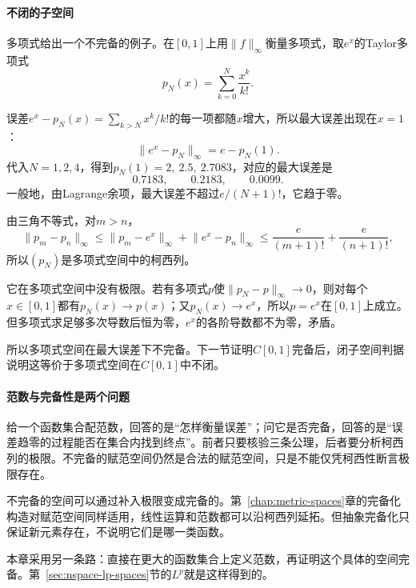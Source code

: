 \paragraph{不闭的子空间}
多项式给出一个不完备的例子。在$[0,1]$上用$\lVert f\rVert_\infty$衡量多项式，取$e^x$的Taylor多项式
\[
 p_N(x)=\sum_{k=0}^N\frac{x^k}{k!}.
\]

误差$e^x-p_N(x)=\sum_{k>N}x^k/k!$的每一项都随$x$增大，所以最大误差出现在$x=1$：
\[
 \lVert e^x-p_N\rVert_\infty=e-p_N(1).
\]
代入$N=1,2,4$，得到$p_N(1)=2,\ 2.5,\ 2.7083$，对应的最大误差是
\[
 0.7183,\qquad 0.2183,\qquad 0.0099.
\]
一般地，由Lagrange余项，最大误差不超过$e/(N+1)!$，它趋于零。

由三角不等式，对$m>n$，
\[
 \lVert p_m-p_n\rVert_\infty\leq\lVert p_m-e^x\rVert_\infty+\lVert e^x-p_n\rVert_\infty\leq\frac{e}{(m+1)!}+\frac{e}{(n+1)!},
\]
所以$(p_N)$是多项式空间中的柯西列。

它在多项式空间中没有极限。若有多项式$p$使$\lVert p_N-p\rVert_\infty\to0$，则对每个$x\in[0,1]$都有$p_N(x)\to p(x)$；又$p_N(x)\to e^x$，所以$p=e^x$在$[0,1]$上成立。但多项式求足够多次导数后恒为零，$e^x$的各阶导数都不为零，矛盾。

所以多项式空间在最大误差下不完备。下一节证明$C[0,1]$完备后，闭子空间判据说明这等价于多项式空间在$C[0,1]$中不闭。

\paragraph{范数与完备性是两个问题}
给一个函数集合配范数，回答的是“怎样衡量误差”；问它是否完备，回答的是“误差趋零的过程能否在集合内找到终点”。前者只要核验三条公理，后者要分析柯西列的极限。不完备的赋范空间仍然是合法的赋范空间，只是不能仅凭柯西性断言极限存在。

不完备的空间可以通过补入极限变成完备的。第~\ref{chap:metric-spaces}章的完备化构造对赋范空间同样适用，线性运算和范数都可以沿柯西列延拓。但抽象完备化只保证新元素存在，不说明它们是哪一类函数。

本章采用另一条路：直接在更大的函数集合上定义范数，再证明这个具体的空间完备。第~\ref{sec:nspace-lp-spaces}节的$L^p$就是这样得到的。
